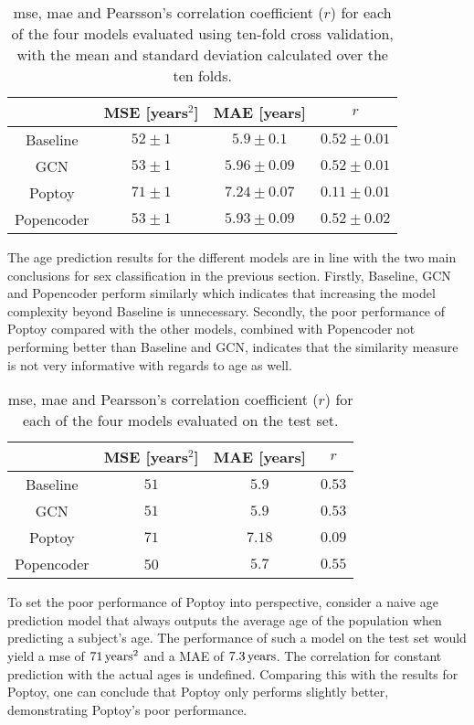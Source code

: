 \begin{table}[!htbp]
    \centering
    \caption{\acrfull{mse}, \acrfull{mae} and Pearsson's correlation coefficient ($r$) for each of the four models evaluated using ten-fold cross validation, with the mean and standard deviation calculated over the ten folds.}
    \begin{tabular}{c|c|c|c}
         &  MSE [years$^2$]& MAE [years] & $r$ \\ \hline 
        Baseline &$52\pm1$& $5.9\pm0.1$&$0.52\pm0.01$\\
        GCN & $53\pm1$& $5.96\pm 0.09 $& $0.52\pm0.01$\\
        Poptoy &$71\pm 1$ & $7.24\pm0.07$ &$ 0.11\pm 0.01$\\
        Popencoder &$53\pm1$& $5.93\pm 0.09$ & $0.52\pm0.02$\\
    \end{tabular}
    \label{tab:age_model_results}
\end{table}

The age prediction results for the different models are in line with the two main conclusions for sex classification in the previous section. Firstly, Baseline, GCN and Popencoder perform similarly which indicates that increasing the model complexity beyond Baseline is unnecessary. Secondly, the poor performance of Poptoy compared with the other models, combined with Popencoder not performing better than Baseline and GCN, indicates that the similarity measure is not very informative with regards to age as well. 

\begin{table}[!htbp]
    \centering
    \caption{\acrfull{mse}, \acrfull{mae} and Pearsson's correlation coefficient ($r$) for each of the four models evaluated on the test set.}
    \begin{tabular}{c|c|c|c}
         &  MSE [years$^2$]& MAE [years] & $r$ \\ \hline 
        Baseline & $51 $& $5.9 $&$0.53 $\\
        GCN & $51 $& $5.9  $& $0.53 $\\
        Poptoy &$71 $ & $7.18 $ &$ 0.09 $\\
        Popencoder &50 & $5.7 $ & $0.55 $\\
    \end{tabular}
    \label{tab:age_final_model_results}
\end{table}

To set the poor performance of Poptoy into perspective, consider a naive age prediction model that always outputs the average age of the population when predicting a subject's age. The performance of such a model on the test set would yield a \acrshort{mse} of $71\rm\,years^2$ and a MAE of $7.3\rm\,years$. The correlation for constant prediction with the actual ages is undefined. Comparing this with the results for Poptoy, one can conclude that Poptoy only performs slightly better, demonstrating Poptoy's poor performance.

